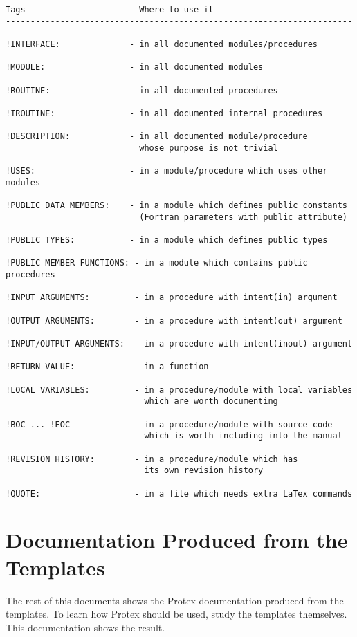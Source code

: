\documentclass[10pt]{article}
\begin{document}
\begin{verbatim}
Tags                       Where to use it
----------------------------------------------------------------------------
!INTERFACE:              - in all documented modules/procedures

!MODULE:                 - in all documented modules

!ROUTINE:                - in all documented procedures

!IROUTINE:               - in all documented internal procedures

!DESCRIPTION:            - in all documented module/procedure 
                           whose purpose is not trivial

!USES:                   - in a module/procedure which uses other modules

!PUBLIC DATA MEMBERS:    - in a module which defines public constants
                           (Fortran parameters with public attribute)

!PUBLIC TYPES:           - in a module which defines public types

!PUBLIC MEMBER FUNCTIONS: - in a module which contains public procedures

!INPUT ARGUMENTS:         - in a procedure with intent(in) argument

!OUTPUT ARGUMENTS:        - in a procedure with intent(out) argument

!INPUT/OUTPUT ARGUMENTS:  - in a procedure with intent(inout) argument

!RETURN VALUE:            - in a function
 
!LOCAL VARIABLES:         - in a procedure/module with local variables 
                            which are worth documenting

!BOC ... !EOC             - in a procedure/module with source code
                            which is worth including into the manual

!REVISION HISTORY:        - in a procedure/module which has 
                            its own revision history

!QUOTE:                   - in a file which needs extra LaTex commands
\end{verbatim}

\newpage

\section{Documentation Produced from the Templates}

The rest of this documents shows the Protex documentation
produced from the templates. To learn how Protex should be
used, study the templates themselves. This documentation
shows the result.


\end{document}
